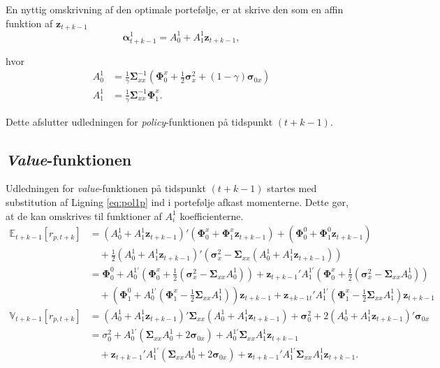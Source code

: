 \documentclass[
  a4paper,
  oneside]{memoir}
\begin{document}
En nyttig omskrivning af den optimale portefølje, er at skrive den som en affin funktion af \(\bm{z}_{t+k-1}\)
\begin{equation}
\bm{\alpha}_{t+k-1}^{1} = A_0^1 + A_1^1\bm{z}_{t+k-1}, \label{eq:pol1p}
\end{equation}

hvor
\begin{align*}
A_0^1&=\frac{1}{\gamma} \bm{\Sigma}_{xx}^{-1}\left(\bm{\Phi}_0^x + \frac{1}{2}\bm{\sigma}_x^2+(1-\gamma)  \bm{\sigma}_{0x}\right)\\
A_1^1&=\frac{1}{\gamma} \bm{\Sigma}_{xx}^{-1}\bm{\Phi}_1^x.
\end{align*}

Dette afslutter udledningen for \emph{policy}-funktionen på tidspunkt \((t+k-1)\).

\hypertarget{value-funktionen}{%
\subsection{\texorpdfstring{\emph{Value}-funktionen}{Value-funktionen}}\label{value-funktionen}}

Udledningen for \emph{value}-funktionen på tidspunkt \((t+k-1)\) startes med substitution af Ligning \eqref{eq:pol1p} ind i portefølje afkast momenterne. Dette gør, at de kan omskrives til funktioner af \(A_i^1\) koefficienterne.
\begin{align*}
\mathbb{E}_{t+k-1}[r_{p,t+k}] &= (A_0^1 + A_1^1\bm{z}_{t+k-1})' (\bm{\Phi}_0^x +\bm{\Phi}_1^x\bm{z}_{t+k-1}) + (\bm{\Phi}_0^0 +\bm{\Phi}_1^0 \bm{z}_{t+k-1})\\
&\quad+\frac{1}{2} (A_0^1 + A_1^1\bm{z}_{t+k-1})' (\bm{\sigma}_x^2-\bm{\Sigma}_{xx}(A_0^1 + A_1^1\bm{z}_{t+k-1}))\\
&=\bm{\Phi}_0^0+ A_0^{1\prime} (\bm{\Phi}_0^x + \frac{1}{2} (\bm{\sigma}_x^2 - \bm{\Sigma}_{xx} A_0^1)) + \bm{z}_{t+k-1}' A_1^{1\prime} (\bm{\Phi}_0^x + \frac{1}{2} (\bm{\sigma}_x^2  - \bm{\Sigma}_{xx} A_0^1))\\
&\quad+ (\bm{\Phi}_1^0 + A_0^{1\prime} (\bm{\Phi}_1^x - \frac{1}{2} \bm{\Sigma}_{xx} A_1^1)) \bm{z}_{t+k-1} +\bm{z}_{+k-1t}' A_1^{1\prime} (\bm{\Phi}_1^x - \frac{1}{2} \bm{\Sigma}_{xx} A_1^1) \bm{z}_{t+k-1}\\
\mathbb{V}_{t+k-1}[r_{p,t+k}]&=(A_0^1 + A_1^1\bm{z}_{t+k-1})'\bm{\Sigma}_{xx}(A_0^1 + A_1^1\bm{z}_{t+k-1})+ \bm{\sigma}_0^2 + 2(A_0^1 + A_1^1\bm{z}_{t+k-1})'\bm{\sigma}_{0x}\\
&=\sigma_0^2 + A_0^{1\prime} (\bm{\Sigma}_{xx} A_0^1 + 2\bm{\sigma}_{0x}) + A_0^{1\prime}\bm{\Sigma}_{xx}A_1^1 \bm{z}_{t+k-1}\\
&\quad+\bm{z}_{t+k-1}' A_1^{1\prime} (\bm{\Sigma}_{xx} A_0^1 + 2\bm{\sigma}_{0x}) + \bm{z}_{t+k-1}' A_1^{1\prime} \bm{\Sigma}_{xx} A_1^1 \bm{z}_{t+k-1}.
\end{align*}
\end{document}
